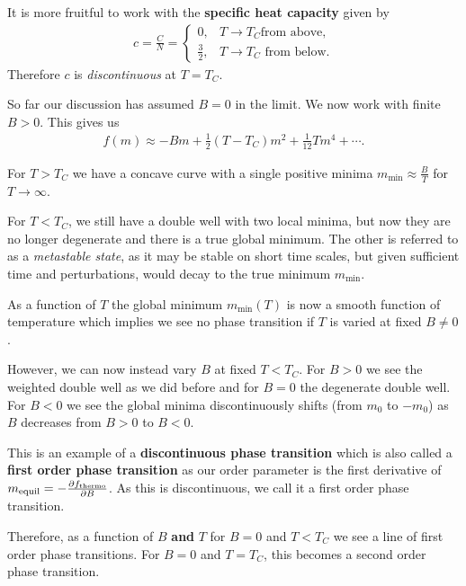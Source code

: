 It is more fruitful to work with the \textbf{specific heat capacity} given by
\begin{align}
    c = \frac{C}{N} = \begin{cases}
        0, & T \to T_C \text{from above,}\\
        \frac{3}{2}, & T \to T_C \text{~from below}.
    \end{cases}
\end{align}
Therefore $c$ is \textit{discontinuous} at $T = T_C$.

So far our discussion has assumed $B = 0$ in the limit. We now work with finite $B > 0$. This gives us
\begin{align}
    f \left( m \right) \approx - B m + \frac{1}{2} \left( T - T_C \right) m^2 + \frac{1}{12} T m^{4} + \cdots
.\end{align}

For $T > T_C$ we have a concave curve with a single positive minima $m_{\text{min}} \approx \frac{B}{T}$ for $T \to \infty$.

For $T < T_C$, we still have a double well with two local minima, but now they are no longer degenerate and there is a true global minimum. The other is referred to as a \textit{metastable state}, as it may be stable on short time scales, but given sufficient time and perturbations, would decay to the true minimum $m_\text{min}$.

As a function of $T$ the global minimum $m_\text{min}\left( T \right) $ is now a smooth function of temperature which implies we see no phase transition if $T$ is varied at fixed $B \neq 0$.

However, we can now instead vary $B$ at fixed $T < T_C$. For $B > 0$ we see the weighted double well as we did before and for $B = 0$ the degenerate double well. For $B < 0$ we see the global minima discontinuously shifts (from $m_0$ to $-m_0$) as $B$ decreases from $B > 0$ to $B < 0$.

This is an example of a \textbf{discontinuous phase transition} which is also called a \textbf{first order phase transition} as our order parameter is the first derivative of $m_\text{equil} = - \pdv{f_\text{thermo}}{B}$. As this is discontinuous, we call it a first order phase transition.

Therefore, as a function of $B$ \textbf{and} $T$ for $B = 0$ and $T < T_C$ we see a line of first order phase transitions. For $B = 0$ and $T = T_C$, this becomes a second order phase transition.
